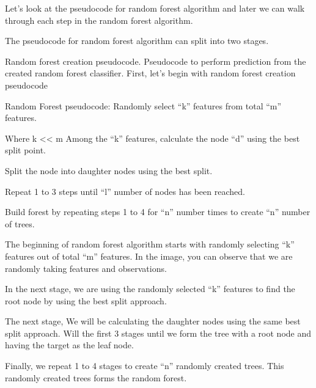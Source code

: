 \documentclass[a4paper,12pt]{article}
\begin{document}
Let’s look at the pseudocode for random forest algorithm and later we can walk through each step in the random forest algorithm.

The pseudocode for random forest algorithm can split into two stages.

Random forest creation pseudocode.
Pseudocode to perform prediction from the created random forest classifier.
First, let’s begin with random forest creation pseudocode

Random Forest pseudocode:
Randomly select “k” features from total “m” features.

Where k << m
Among the “k” features, calculate the node “d” using the best split point.

Split the node into daughter nodes using the best split.

Repeat 1 to 3 steps until “l” number of nodes has been reached.

Build forest by repeating steps 1 to 4 for “n” number times to create “n” number of trees.

The beginning of random forest algorithm starts with randomly selecting “k” features out of total “m” features. In the image, you can observe that we are randomly taking features and observations.

In the next stage, we are using the randomly selected “k” features to find the root node by using the best split approach.

The next stage, We will be calculating the daughter nodes using the same best split approach. Will the first 3 stages until we form the tree with a root node and having the target as the leaf node.

Finally, we repeat 1 to 4 stages to create “n” randomly created trees. This randomly created trees forms the random forest.
\end{document}
